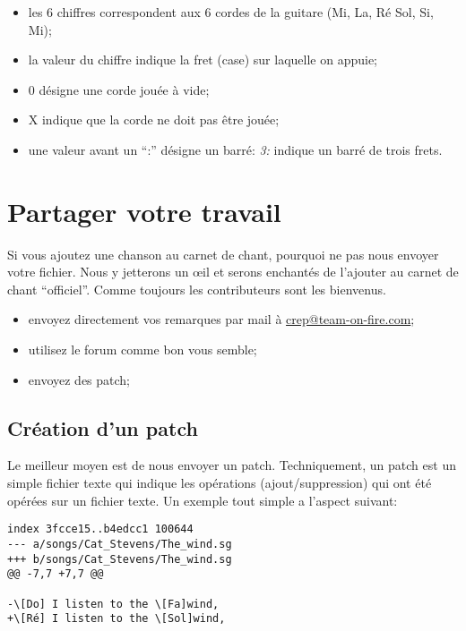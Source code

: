 \documentclass[a4paper]{article}
\begin{document}
\begin{itemize}
\item les 6 chiffres correspondent aux 6 cordes de la
guitare (Mi, La, Ré Sol, Si, Mi);
\item la valeur du chiffre indique la fret (case) sur laquelle on
  appuie;
\item 0 désigne une corde jouée à vide;
\item X indique que la corde ne doit pas être jouée;
\item une valeur avant un ``:'' désigne un barré: \emph{3:} indique
un barré de trois frets.
\end{itemize}


\section{Partager votre travail}

Si vous ajoutez une chanson au carnet de chant, pourquoi ne pas nous
envoyer votre fichier. Nous y jetterons un \oe{}il et serons enchantés
de l'ajouter au carnet de chant ``officiel''. Comme toujours les
contributeurs sont les bienvenus.

\begin{itemize}
\item envoyez directement vos remarques par mail à
  \url{crep@team-on-fire.com};
\item utilisez le forum comme bon vous semble;
\item envoyez des patch;
\end{itemize}

\subsection{Création d'un patch}

Le meilleur moyen est de nous envoyer un patch. Techniquement, un
patch est un simple fichier texte qui indique les opérations
(ajout/suppression) qui ont été opérées sur un fichier texte. Un
exemple tout simple a l'aspect suivant:

\begin{verbatim}
index 3fcce15..b4edcc1 100644
--- a/songs/Cat_Stevens/The_wind.sg
+++ b/songs/Cat_Stevens/The_wind.sg
@@ -7,7 +7,7 @@

-\[Do] I listen to the \[Fa]wind,
+\[Ré] I listen to the \[Sol]wind,
\end{verbatim}
\end{document}
